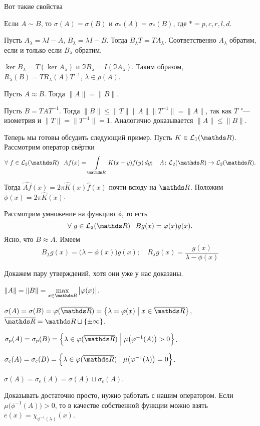 Вот такие свойства
\begin{Ut}
  Если $A\sim B$, то $\sigma(A) = \sigma(B)$ и $\sigma_*(A) = \sigma_*(B)$, где $* = p,c,r,l,d$.
\end{Ut}
\begin{Proof}
  Пусть $A_\lambda = \lambda I - A$, $B_\lambda = \lambda I - B$. Тогда $B_\lambda T = T A_\lambda$. Соответственно $A_\lambda$ обратим, если и только если $B_\lambda$ обратим.

$\ker B_\lambda = T(\ker A_\lambda)$ и $\Im B_\lambda = I(\Im A_\lambda)$. Таким образом, $R_\lambda(B) = T R_\lambda(A) T^{-1}$, $\lambda\in\rho(A)$.
\end{Proof}

\begin{Ut}
  Пусть $A\approx B$. Тогда $\|A\|=\|B\|$.
\end{Ut}
\begin{Proof}
  Пусть $B = TAT^{-1}$. Тогда $\|B\|\le \|T\| \|A\| \|T^{-1}\| = \|A\|$, так как $T$ "--- изометрия и $\|T\| = \|T^{-1}\| = 1$. Аналогично доказывается $\|A\|\le \|B\|$. 
\end{Proof}

Теперь мы готовы обсудить следующий пример. Пусть $K\in \L_1(\R)$. Рассмотрим оператор свёртки
\[
  \forall\ f\in\L_2(\R)\pau A f(x) = \Gint{\R} K(x-y) f(y)\,dy;\quad A\colon \L_2(\R)\to\L_2(\R).
\]

Тогда $\widehat{A f}(x) = 2\pi \hat K(x)\hat f(x)$ почти всюду на $\R$. Положим $\phi(x) = 2\pi\hat K(x)$.

Рассмотрим умножение на функцию $\phi$, то есть
\[
  \forall\ g\in\L_2(\R)\pau Bg(x) = \phi(x)g(x).
\]
Ясно, что $B\approx A$. Имеем
\[
  B_\lambda g(x) = \big(\lambda- \phi(x)\big)g(x);\quad
  R_\lambda g(x) = \frac{g(x)}{\lambda-\phi(x)}
\]

Докажем пару утверждений, хотя они уже у нас доказаны.
\begin{azItems}
\item $\|A\| = \|B\| = \max\limits_{x\in\R}\big|\phi(x)\big|$.
\item $\sigma(A) = \sigma(B) = \phi(\ol\R) = \big\{\lambda = \phi(x)\bigm|x\in\ol\R\big\}$, $\ol\R = \R\sqcup\{\pm\infty\}$.
\item $\sigma_p(A) = \sigma_p(B) = \Big\{\lambda\in\phi(\ol\R)\Bigm|\mu\big(\phi^{-1}(A)\big)>0\Big\}$.
\item $\sigma_c(A) = \sigma_c(B) = 
  \Big\{ \lambda\in\phi(\ol\R)\Bigm| \mu\big(\phi^{-1}(\lambda)\big)=0\Big\}$.
\item $\sigma(A) = \sigma_e(A) = \sigma(A)\sqcup \sigma_c(A)$.
\end{azItems}
Доказывать достаточно просто, нужно работать с нашим оператором. Если $\mu\big(\phi^{-1}(A)\big)>0$, то в качестве собственной функции можно взять $e(x) = \chi_{\phi^{-1}(\lambda)}(x)$.


